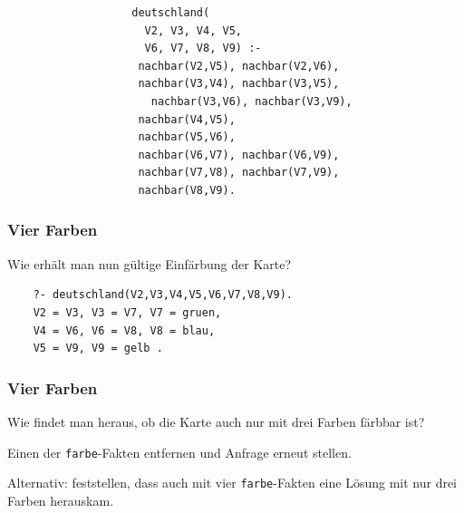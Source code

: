\documentclass{beamer}
\begin{document}
\begin{frame}[fragile]
\begin{figure}
\begin{subfigure}{0.3\textwidth}
    \end{subfigure}
    \pause
    \begin{subfigure}{0.65\textwidth}
      \begin{lstlisting}
        deutschland(
          V2, V3, V4, V5,
          V6, V7, V8, V9) :-
         nachbar(V2,V5), nachbar(V2,V6),
         nachbar(V3,V4), nachbar(V3,V5),
           nachbar(V3,V6), nachbar(V3,V9),
         nachbar(V4,V5),
         nachbar(V5,V6),
         nachbar(V6,V7), nachbar(V6,V9),
         nachbar(V7,V8), nachbar(V7,V9),
         nachbar(V8,V9).
      \end{lstlisting}
    \end{subfigure}
  \end{figure}
\end{frame}

\begin{frame}[fragile]
  \frametitle{Vier Farben}
  Wie erhält man nun gültige Einfärbung der Karte?
  \pause
  \begin{lstlisting}
    ?- deutschland(V2,V3,V4,V5,V6,V7,V8,V9).
    V2 = V3, V3 = V7, V7 = gruen,
    V4 = V6, V6 = V8, V8 = blau,
    V5 = V9, V9 = gelb .
  \end{lstlisting}
\end{frame}

\begin{frame}
  \frametitle{Vier Farben}
  Wie findet man heraus, ob die Karte auch nur mit drei Farben färbbar ist?
  
  \pause
  Einen der \lstinline{farbe}-Fakten entfernen und Anfrage erneut stellen.
  
  \pause
  Alternativ: feststellen, dass auch mit vier \lstinline{farbe}-Fakten eine Lösung mit nur drei Farben herauskam.
\end{frame}
\end{document}
